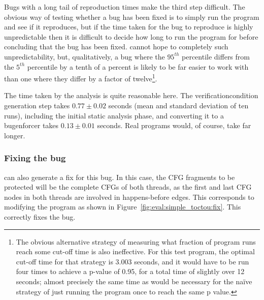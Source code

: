 Bugs with a long tail of reproduction times make the third step
difficult.  The obvious way of testing whether a bug has been fixed is
to simply run the program and see if it reproduces, but if the time
taken for the bug to reproduce is highly unpredictable then it is
difficult to decide how long to run the program for before concluding
that the bug has been fixed.  {\Technique} cannot hope to completely
such unpredictability, but, qualitatively, a bug where the $95^{th}$
percentile differs from the $5^{th}$ percentile by a tenth of a
percent is likely to be far easier to work with than one where they
differ by a factor of twelve\footnote{The obvious alternative strategy
  of measuring what fraction of program runs reach some cut-off time
  is also ineffective.  For this test program, the optimal cut-off
  time for that strategy is 3.003 seconds, and it would have to be run
  four times to achieve a p-value of 0.95, for a total time of
  slightly over 12 seconds; almost precisely the same time as would be
  necessary for the na\"{i}ve strategy of just running the program
  once to reach the same p value.}.

The time taken by the analysis is quite reasonable here.  The
\gls{verificationcondition} generation step takes $0.77 \pm 0.02$
seconds (mean and standard deviation of ten runs), including the
initial static analysis phase, and converting it to a
\gls{bugenforcer} takes $0.13 \pm 0.01$ seconds.  Real programs would,
of course, take far longer.

\subsubsection{Fixing the bug}
{\Implementation} can also generate a fix for this bug.  In this case,
the CFG fragments to be protected will be the complete CFGs of both
threads, as the first and last CFG nodes in both threads are involved
in happens-before edges.  This corresponds to modifying the program as
shown in Figure~\ref{fig:eval:simple_toctou:fix}.  This correctly
fixes the bug.

